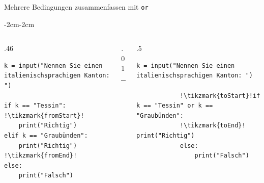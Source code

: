 \begin{frame}[fragile]{Mehrere Bedingungen zusammenfassen mit \lstinline|or|}
    \begin{adjustwidth}{-2cm}{-2cm}
        \begin{columns}
            \begin{column}{.46\pagewidth}
                \begin{lstlisting}[escapechar=!, basicstyle=\footnotesize\ttfamily]
k = input("Nennen Sie einen italienischsprachigen Kanton: ")

if k == "Tessin":      !\tikzmark{fromStart}!
    print("Richtig")
elif k == "Graubünden":
    print("Richtig")   !\tikzmark{fromEnd}!
else:
    print("Falsch")
\end{lstlisting}
            \end{column}
            \begin{column}{.01\pagewidth}
                \rule{0.4pt}{\textheight}
            \end{column}
            \begin{column}{.5\pagewidth}
                \begin{lstlisting}[escapechar=!, basicstyle=\footnotesize\ttfamily]
            k = input("Nennen Sie einen italienischsprachigen Kanton: ")

            !\tikzmark{toStart}!if k == "Tessin" or k == "Graubünden":
            !\tikzmark{toEnd}!    print("Richtig")
            else:
                print("Falsch")
        \end{lstlisting}
            \end{column}
        \end{columns}
    \end{adjustwidth}
\end{frame}

